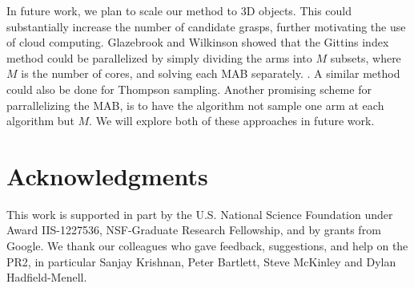 \documentclass[10pt, conference]{ieeeconf}      %
\begin{document}
In future work, we plan to scale our method to 3D objects. This could substantially increase the number of candidate grasps, further motivating the use of cloud computing. Glazebrook and Wilkinson showed that the Gittins index method could be parallelized by simply dividing the arms into $M$ subsets, where $M$ is the number of cores, and solving each MAB separately. \cite{glazebrook2000index}. A similar method could also be done for Thompson sampling. Another promising scheme for parrallelizing the MAB, is to have the algorithm not sample one arm at each algorithm but $M$. We will explore both of these approaches in future work.

\section{Acknowledgments} 
This work is supported in part by the U.S. National Science Foundation under Award IIS-1227536, NSF-Graduate Research Fellowship, and by grants from Google. 
We thank our colleagues who gave feedback, suggestions, and help on the PR2, in particular Sanjay Krishnan, Peter Bartlett, Steve McKinley and Dylan Hadfield-Menell.



\end{document}
